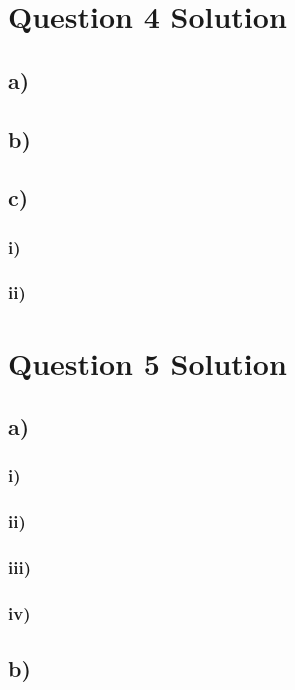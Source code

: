 \documentclass[letterpaper,12pt]{article}
\begin{document}
\section{Question 4 Solution}
\subsection{a)}
\subsection{b)}
\subsection{c)}

\subsubsection{i)}

\subsubsection{ii)}
\section{Question 5 Solution}
\subsection{a)}
\subsubsection{i)}
\subsubsection{ii)}
\subsubsection{iii)}
\subsubsection{iv)}


\subsection{b)}
\end{document}
